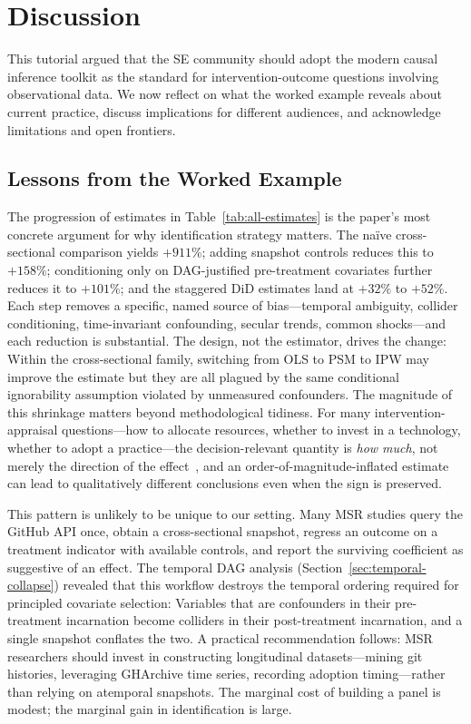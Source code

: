 \section{Discussion}
\label{sec:discussion}

This tutorial argued that the SE community should adopt the modern causal inference toolkit as the standard for intervention-outcome questions involving observational data.
We now reflect on what the worked example reveals about current practice, discuss implications for different audiences, and acknowledge limitations and open frontiers.

\subsection{Lessons from the Worked Example}

The progression of estimates in Table~\ref{tab:all-estimates} is the paper's most concrete argument for why identification strategy matters.
The na\"ive cross-sectional comparison yields $+911\%$; adding snapshot controls reduces this to $+158\%$; conditioning only on DAG-justified pre-treatment covariates further reduces it to $+101\%$; and the staggered DiD estimates land at $+32\%$ to $+52\%$.
Each step removes a specific, named source of bias---temporal ambiguity, collider conditioning, time-invariant confounding, secular trends, common shocks---and each reduction is substantial.
The design, not the estimator, drives the change: Within the cross-sectional family, switching from OLS to PSM to IPW may improve the estimate but they are all plagued by the same conditional ignorability assumption violated by unmeasured confounders.
The magnitude of this shrinkage matters beyond methodological tidiness.
For many intervention-appraisal questions---how to allocate resources, whether to invest in a technology, whether to adopt a practice---the decision-relevant quantity is \emph{how much}, not merely the direction of the effect~\cite{lundberg2021estimand}, and an order-of-magnitude-inflated estimate can lead to qualitatively different conclusions even when the sign is preserved.

This pattern is unlikely to be unique to our setting.
Many MSR studies query the GitHub API once, obtain a cross-sectional snapshot, regress an outcome on a treatment indicator with available controls, and report the surviving coefficient as suggestive of an effect.
The temporal DAG analysis (Section~\ref{sec:temporal-collapse}) revealed that this workflow destroys the temporal ordering required for principled covariate selection: Variables that are confounders in their pre-treatment incarnation become colliders in their post-treatment incarnation, and a single snapshot conflates the two.
A practical recommendation follows: MSR researchers should invest in constructing longitudinal datasets---mining git histories, leveraging GHArchive time series, recording adoption timing---rather than relying on atemporal snapshots.
The marginal cost of building a panel is modest; the marginal gain in identification is large.

